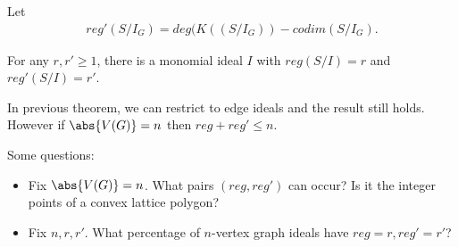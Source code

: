 \begin{definition}
    Let
    \begin{align*}
        reg'(S / I_G) = deg (K((S / I_G)) - codim (S/ I_G).
    \end{align*}
\end{definition}

\begin{theorem}
    For any $r,r' \geq 1$, there is a monomial ideal $I$ with $reg (S/I) = r$ and $reg' (S/I) = r'$.
\end{theorem}

\begin{theorem}
    In previous theorem, we can restrict to edge ideals and the result still holds. However if $\abs{V(G)} = n$ then $reg + reg' \leq n$.
\end{theorem}

\begin{remark}
    Some questions:
    \begin{itemize}
        \item Fix $\abs{V(G) } = n$. What pairs $(reg, reg')$ can occur? Is it the integer points of a convex lattice polygon?
        \item Fix $n,r,r'$. What percentage of $n$-vertex graph ideals have $reg = r, reg' = r'$?
    \end{itemize}
\end{remark}